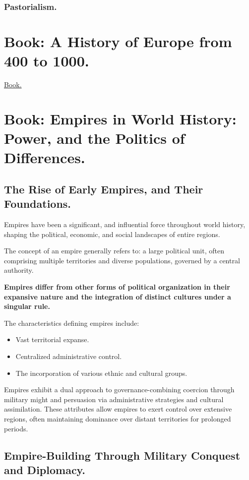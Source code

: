 \documentclass[11pt]{book}
\begin{document}
				\subsubsection{Pastorialism.}
				


		\section{Book: A History of Europe from 400 to 1000.}
			\href{Books/Empires In World History PDF.pdf}{Book.}

		\section{Book: Empires in World History: Power, and the Politics of Differences.}
			
			\subsection{The Rise of Early Empires, and Their Foundations.}
				Empires have been a significant, and influential force throughout world history, shaping the political, economic, and social landscapes of entire regions.
				
				The concept of an empire generally refers to: a large political unit, often comprising multiple territories and diverse populations, governed by a central authority.

				\textbf{Empires differ from other forms of political organization in their expansive nature and the integration of distinct cultures under a singular rule.}

				The characteristics defining empires include:
				\begin{itemize}
					\item  Vast territorial expanse.
					\item  Centralized administrative control.
					\item  The incorporation of various ethnic and cultural groups.
				\end{itemize}

				Empires exhibit a dual approach to governance-combining coercion through military might and persuasion via administrative strategies and cultural assimilation. These attributes allow empires to exert control over extensive regions, often maintaining dominance over distant territories for prolonged periods.
			
			\subsection{Empire-Building Through Military Conquest and Diplomacy.}
			
\end{document}
